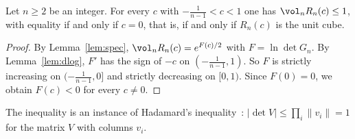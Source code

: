 \begin{theorem}\label{thm:main}
Let $n\ge2$ be an integer. For every $c$ with $-\frac{1}{n-1}<c<1$ one has $\vol_nR_n(c)\le1$, with equality if and only if $c=0$, that is, if and only if $R_n(c)$ is the unit cube.
\end{theorem}
\begin{proof}
By Lemma~\ref{lem:spec}, $\vol_nR_n(c)=e^{F(c)/2}$ with $F=\ln\det G_n$.
By Lemma~\ref{lem:dlog}, $F'$ has the sign of $-c$ on $(-\frac{1}{n-1},1)$.
So $F$ is strictly increasing on $(-\frac{1}{n-1},0]$ and strictly decreasing on $[0,1)$.
Since $F(0)=0$, we obtain $F(c)<0$ for every $c\ne0$.
\end{proof}
\begin{remark}
The inequality is an instance of Hadamard's inequality~\cite{hadamard}: $|\det V|\le\prod_i\|v_i\|=1$ for the matrix $V$ with columns $v_i$.
\end{remark}
